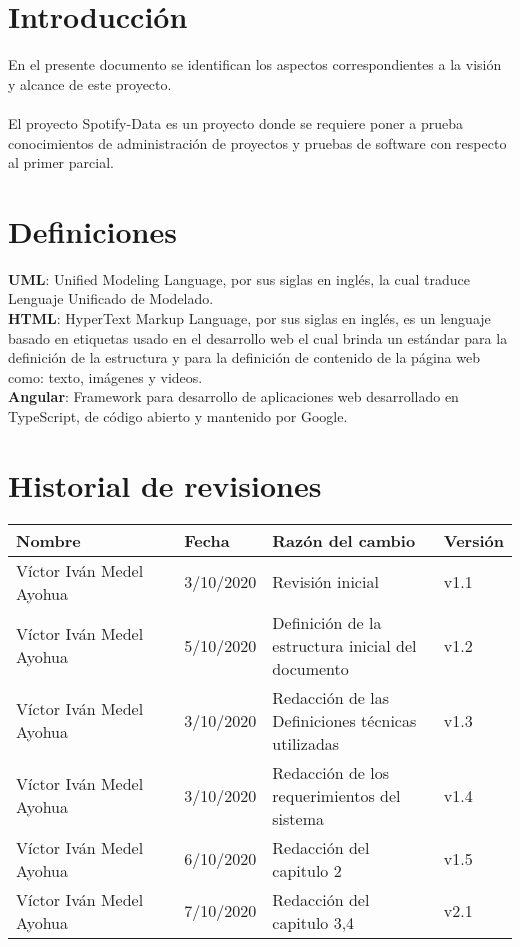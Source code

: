 \documentclass[12pt,a4paper]{book}
\date{\today}
\begin{document}
 	

\tableofcontents
\newpage

\section{Introducción}
\vspace{0.5 cm}
En el presente documento se identifican los aspectos correspondientes a la visión y alcance de este proyecto.\\
\\ El proyecto Spotify-Data es un proyecto donde se requiere poner a prueba conocimientos de administración de proyectos y pruebas de software con respecto al primer parcial.
		
\section{Definiciones}
\vspace{0.5 cm}
\textbf {UML}: Unified Modeling Language, por sus siglas en inglés, la cual traduce
Lenguaje Unificado de Modelado.\\

\textbf {HTML}: HyperText Markup Language, por sus siglas en inglés, es un lenguaje
basado en etiquetas usado en el desarrollo web el cual brinda un estándar para
la definición de la estructura y para la definición de contenido de la página web
como: texto, imágenes y videos.\\

\textbf {Angular}: Framework para desarrollo de aplicaciones web desarrollado en TypeScript, de código abierto y mantenido por Google.\\

\section{Historial de revisiones}
\vspace{0.5 cm}
\begin{table}[h!]
\centering
\begin{tabular}{|p{0.35\linewidth}|p{0.15\linewidth}|p{0.35\linewidth}|p{0.15\linewidth}|}
\hline
\textbf{Nombre}&\textbf{Fecha}&\textbf{Razón del cambio}&\textbf{Versión}
\\\hline
Víctor Iván Medel Ayohua&3/10/2020&Revisión inicial&v1.1\\\hline
Víctor Iván Medel Ayohua&5/10/2020&Definición de la estructura inicial del documento&v1.2\\\hline
Víctor Iván Medel Ayohua&3/10/2020&Redacción de las Definiciones técnicas utilizadas&v1.3\\\hline
Víctor Iván Medel Ayohua&3/10/2020&Redacción de los requerimientos del sistema&v1.4\\\hline
Víctor Iván Medel Ayohua&6/10/2020&Redacción del capitulo 2&v1.5\\\hline
Víctor Iván Medel Ayohua&7/10/2020&Redacción del capitulo 3,4 &v2.1\\\hline
\end{tabular}
\end{table}
\end{document}
